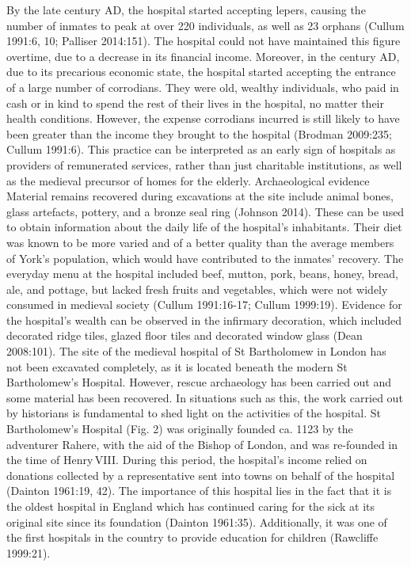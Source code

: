 \documentclass[%
	]{ijsra}
\begin{document}
By the late  century AD, the hospital started accepting lepers, causing the number of inmates to peak at over 220 individuals, as well as 23 orphans (Cullum 1991:6, 10; Palliser 2014:151). The hospital could not have maintained this figure overtime, due to a decrease in its financial income. Moreover, in the  century AD, due to its precarious economic state, the hospital started accepting the entrance of a large number of corrodians. They were old, wealthy individuals, who paid in cash or in kind to spend the rest of their lives in the hospital, no matter their health conditions. However, the expense corrodians incurred is still likely to have been greater than the income they brought to the hospital (Brodman 2009:235; Cullum 1991:6). This practice can be interpreted as an early sign of hospitals as providers of remunerated services, rather than just charitable institutions, as well as the medieval precursor of homes for the elderly.
Archaeological evidence
Material remains recovered during excavations at the site include animal bones, glass artefacts, pottery, and a bronze seal ring (Johnson 2014). These can be used to obtain information about the daily life of the hospital’s inhabitants. Their diet was known to be more varied and of a better quality than the average members of York’s population, which would have contributed to the inmates’ recovery. The everyday menu at the hospital included beef, mutton, pork, beans, honey, bread, ale, and pottage, but lacked fresh fruits and vegetables, which were not widely consumed in medieval society (Cullum 1991:16-17; Cullum 1999:19). 
Evidence for the hospital’s wealth can be observed in the infirmary decoration, which included decorated ridge tiles, glazed floor tiles and decorated window glass (Dean 2008:101). 
\IJSRAseparator
The site of the medieval hospital of St Bartholomew in London has not been excavated completely, as it is located beneath the modern St Bartholomew’s Hospital. However, rescue archaeology has been carried out and some material has been recovered.
In situations such as this, the work carried out by historians is fundamental to shed light on the activities of the hospital. St Bartholomew’s Hospital (Fig. 2) %
was originally founded ca. 1123 by the adventurer Rahere, with the aid of the Bishop of London, and was re-founded in the time of Henry\,VIII. During this period, the hospital’s income relied on donations collected by a representative sent into towns on behalf of the hospital (Dainton 1961:19, 42). 
The importance of this hospital lies in the fact that it is the oldest hospital in England which has continued caring for the sick at its original site since its foundation (Dainton 1961:35). Additionally, it was one of the first hospitals in the country to provide education for children (Rawcliffe 1999:21). 
\end{document}
